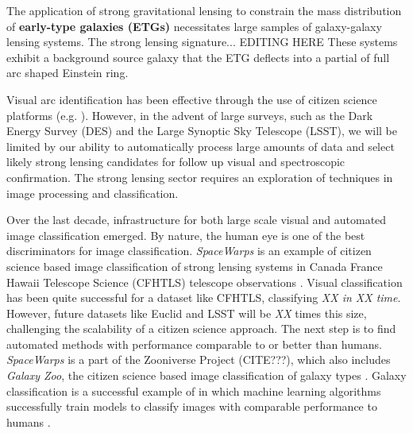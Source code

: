 \documentclass{emulateapj}
\newcommand{\change}[1]{{\it\color{purple} #1}}
\newcommand{\todo}[1]{{\bf\color{blue} #1}}
\begin{document}
The application of strong gravitational lensing to constrain the mass
distribution of \todo{early-type galaxies (ETGs)} necessitates large
samples of galaxy-galaxy lensing systems.  The strong lensing
signature... EDITING HERE These systems exhibit a background source
galaxy that the ETG deflects into a partial of full arc shaped
Einstein ring.

Visual arc identification has been effective through the use of
citizen science platforms (e.g. \citet{marshall_etal16,more_etal16}).
However, in the advent of large surveys, such as the Dark Energy
Survey (DES) and the Large Synoptic Sky Telescope (LSST), we will be
limited by our ability to automatically process large amounts of data
and select likely strong lensing candidates for follow up visual and
spectroscopic confirmation.  The strong lensing sector requires an
exploration of techniques in image processing and classification.

Over the last decade, infrastructure for both large scale visual and
automated image classification emerged. By nature, the human eye is
one of the best discriminators for image classification.  {\em
  SpaceWarps} is an example of citizen science based image
classification of strong lensing systems in Canada France Hawaii
Telescope Science (CFHTLS) telescope observations
\citep{marshall_etal16,more_etal16}.  Visual classification has been
quite successful for a dataset like CFHTLS, classifying \change{XX in
  XX time}.  However, future datasets like Euclid and LSST will be
\change{XX} times this size, challenging the scalability of a citizen
science approach.  The next step is to find automated methods with
performance comparable to or better than humans. {\em SpaceWarps} is a
part of the Zooniverse Project (CITE???), which also includes {\em
  Galaxy Zoo}, the citizen science based image classification of
galaxy types \citep{lintott_etal08}.  Galaxy classification is a
successful example of in which machine learning algorithms
successfully train models to classify images with comparable
performance to humans \citep{dieleman_etal15}.
\end{document}
